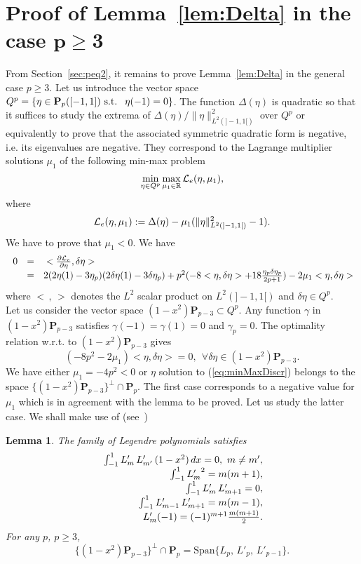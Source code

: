 \documentclass[final]{siamltex}
\newtheorem{lem}{Lemma}
\begin{document}
\section{Proof of Lemma~\ref{lem:Delta} in the case $\pmb{p\ge 3}$}\label{appendix:A}
From Section~\ref{sec:peq2}, it remains 
  to prove Lemma~\ref{lem:Delta} in the general case $p\ge 3$.
Let us introduce the vector space $Q^p=\{
\eta\in{\mathbf{P}}_p([-1,1])
\hbox{ s.t. }\
\eta(-1)=0\}$.  The function $\Delta(\eta)$ is quadratic so that it
suffices to study the extrema of $\Delta(\eta)/\|\eta\|^2_{L^2(]-1,1[)}$
over $Q^p$ or equivalently to prove that the associated symmetric 
quadratic form is
negative, i.e. its eigenvalues are negative. They correspond to the Lagrange
multiplier solutions
$\mu_1$ of the following min-max problem
\begin{equation}\label{eq:minMaxDiscr}
\min_{\eta\in Q^p} \max_{\mu_1\in{{\mathbb R}}} {\cal L}_e(\eta,\mu_1),
\end{equation}
where
\[
{\cal L}_e(\eta,\mu_1) := \Delta(\eta) - \mu_1 (\|\eta\|_{L^2(]-1,1[)}^2-1).
\]
We have to prove that $\mu_1<0$. We have 
\[\hspace{-0.3cm}\begin{array}{rcl}
0&=&{\displaystyle}<\frac{\partial{\cal L}_e}{\partial \eta},\delta \eta >\\
{\displaystyle}\hphantom{ddd}&=&
2(2\eta(1)-3\eta_p)(2\delta\eta(1)-3\delta\eta_p)+p^2(-8<\eta,\delta\eta>
+18\frac{\eta_p\delta\eta_p}{2p+1})
-2\mu_1 <\eta,\delta\eta>
\end{array}\]
where $<\, ,\,>$ denotes the $L^2$ scalar product on $L^2(]-1,1[)$ and
$\delta\eta\in Q^p$.
\\ Let us consider the vector space $(1-x^2) {\mathbf{P}}_{p-3}\subset Q^p$. Any
  function $\gamma$ in $(1-x^2) {\mathbf{P}}_{p-3}$ satisfies $\gamma(-1)=\gamma(1)=0$
and $\gamma_p=0$.
The optimality relation w.r.t. to $(1-x^2) {\mathbf{P}}_{p-3}$ gives
\[
(-8p^2-2\mu_1)<\eta,\delta\eta>=0,\ \ \forall
\delta\eta\in (1-x^2) {\mathbf{P}}_{p-3}.
\]
We have either $\mu_1=-4p^2<0$ or  $\eta$  solution to (\ref{eq:minMaxDiscr})
belongs to the space $\{(1-x^2) {\mathbf{P}}_{p-3}\}^\bot
\cap {\mathbf{P}}_p$. The first case corresponds to a negative value for 
$\mu_1$ which is in
agreement with the lemma to be proved. Let us study the latter case. 
We shall make
use of (see~\cite{AS})
\begin{lem}\label{lem:LagrangePrime} The family of Legendre polynomials satisfies
\begin{eqnarray*}
  \begin{array}{r}
{\displaystyle}\int_{-1}^1 L'_m\,L'_{m'}\,(1-x^2) \, dx = 0, \ m\neq m',\\
{\displaystyle}\int_{-1}^1 {L'_m}^2= m(m+1),\\
{\displaystyle}\int_{-1}^1 L'_m\,L'_{m+1}= 0,\\
{\displaystyle}\int_{-1}^1 L'_{m-1}\,L'_{m+1}= m(m-1),\\
{\displaystyle} L'_m(-1) = (-1)^{m+1} \frac{m(m+1)}{2}.
\end{array}
\end{eqnarray*}
For any $p$, $p\ge 3$,
\[
\{(1-x^2) {\mathbf{P}}_{p-3}\}^\bot \cap {\mathbf{P}}_p = \mathrm{ Span}\{L_{p},\,L'_p,\,L'_{p-1}\}.
\]
\end{lem}
\end{document}
